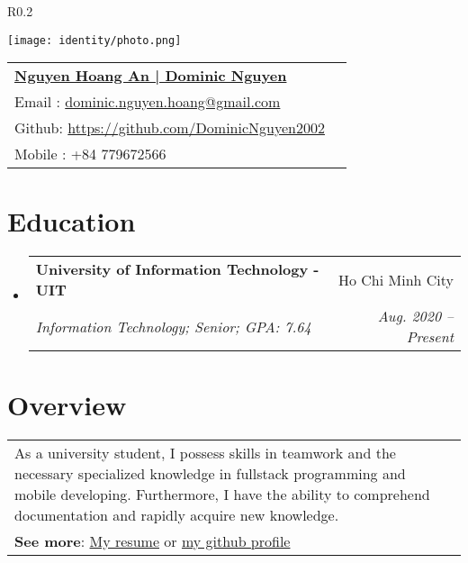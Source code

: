 \documentclass[letterpaper,11pt]{article}
\makeatletter
\newcommand{\resumeSubheading}[4]{
  \vspace{-1pt}\item
    \begin{tabular*}{0.97\textwidth}{l@{\extracolsep{\fill}}r}
      \textbf{#1} & #2 \\
      \textit{\small#3} & \textit{\small #4} \\
    \end{tabular*}\vspace{-5pt}
}
\newcommand{\resumeSubHeadingListStart}{\begin{itemize}[leftmargin=*]}
\newcommand{\resumeSubHeadingListEnd}{\end{itemize}}
\makeatother
\begin{document}


\begin{wrapfigure}{R}{0.2\textwidth}
  \vspace{-2.2cm}
  \begin{center}
    \texttt{[image: identity/photo.png]}
  \end{center}
\end{wrapfigure}


\begin{tabular*}{\textwidth}{l@{\extracolsep{\fill}}r}
  \textbf{\href{https://github.com/DominicNguyen2002/}{\Large Nguyen Hoang An | Dominic Nguyen}} \\
  \vspace{1.5mm}
  Email : \href{mailto:dominic.nguyen.hoang@gmail.com}{dominic.nguyen.hoang@gmail.com} \\
  \vspace{1.5mm}
  Github: \href{https://github.com/DominicNguyen2002/}{https://github.com/DominicNguyen2002}\\
  \vspace{1.5mm}
  Mobile : +84 779672566
\end{tabular*}


\section{Education}
\resumeSubHeadingListStart
\resumeSubheading
{University of Information Technology - UIT}{Ho Chi Minh City}
{Information Technology; Senior; GPA: 7.64 }{Aug. 2020 -- Present}

\resumeSubHeadingListEnd


\section{Overview}
\vspace{2mm}
\begin{tabular}{p{\textwidth} r}
  As a university student, I possess skills in teamwork and the necessary specialized knowledge in fullstack programming and mobile developing.
  Furthermore, I have the ability to comprehend documentation and rapidly acquire new knowledge.
  \vspace{2mm}
  \\ \textbf{See more}: \href{https://github.com/ominicNguyen2002/resume/}{My resume} or \href{https://github.com/ominicNguyen2002/}{my github profile}
\end{tabular}
\end{document}
